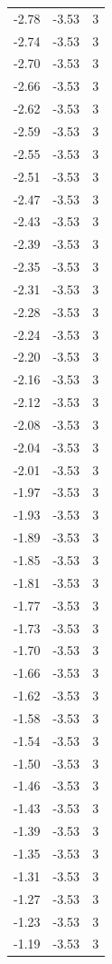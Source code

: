 \begin{longtable}{lrr}
  -2.78 & -3.53 & 3 \\
  -2.74 & -3.53 & 3 \\
  -2.70 & -3.53 & 3 \\
  -2.66 & -3.53 & 3 \\
  -2.62 & -3.53 & 3 \\
  -2.59 & -3.53 & 3 \\
  -2.55 & -3.53 & 3 \\
  -2.51 & -3.53 & 3 \\
  -2.47 & -3.53 & 3 \\
  -2.43 & -3.53 & 3 \\
  -2.39 & -3.53 & 3 \\
  -2.35 & -3.53 & 3 \\
  -2.31 & -3.53 & 3 \\
  -2.28 & -3.53 & 3 \\
  -2.24 & -3.53 & 3 \\
  -2.20 & -3.53 & 3 \\
  -2.16 & -3.53 & 3 \\
  -2.12 & -3.53 & 3 \\
  -2.08 & -3.53 & 3 \\
  -2.04 & -3.53 & 3 \\
  -2.01 & -3.53 & 3 \\
  -1.97 & -3.53 & 3 \\
  -1.93 & -3.53 & 3 \\
  -1.89 & -3.53 & 3 \\
  -1.85 & -3.53 & 3 \\
  -1.81 & -3.53 & 3 \\
  -1.77 & -3.53 & 3 \\
  -1.73 & -3.53 & 3 \\
  -1.70 & -3.53 & 3 \\
  -1.66 & -3.53 & 3 \\
  -1.62 & -3.53 & 3 \\
  -1.58 & -3.53 & 3 \\
  -1.54 & -3.53 & 3 \\
  -1.50 & -3.53 & 3 \\
  -1.46 & -3.53 & 3 \\
  -1.43 & -3.53 & 3 \\
  -1.39 & -3.53 & 3 \\
  -1.35 & -3.53 & 3 \\
  -1.31 & -3.53 & 3 \\
  -1.27 & -3.53 & 3 \\
  -1.23 & -3.53 & 3 \\
  -1.19 & -3.53 & 3 \\

\end{longtable}
